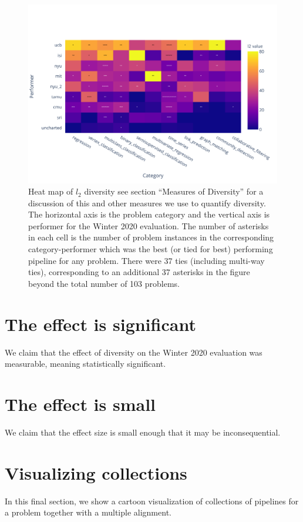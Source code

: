 \documentclass{article}
\begin{document}
\begin{figure}[h]
\centering
\includegraphics[scale=.6]{heatmap.pdf}
\caption{Heat map of $l_2$ diversity see section ``Measures of
  Diversity'' for a discussion of this and other measures we use to
  quantify diversity.  The horizontal axis is the problem category and
  the vertical axis is performer for the Winter 2020 evaluation.  The
  number of asterisks in each cell is the number of problem instances
  in the corresponding category-performer which was the best (or tied
  for best) performing pipeline for any problem.  There were 37 ties
  (including multi-way ties), corresponding to an additional 37
  asterisks in the figure beyond the total number of 103 problems.}
\label{fig:heatmap}
\end{figure}

\section{The effect is significant}
\label{sec:significant}
We claim that the effect of diversity on the Winter 2020 evaluation
was measurable, meaning statistically significant.

\section{The effect is small}
\label{sec:small}
We claim that the effect size is small enough that it may be
inconsequential.

\section{Visualizing collections}
\label{sec:visualization}
In this final section, we show a cartoon visualization of collections
of pipelines for a problem together with a multiple alignment.
\end{document}

